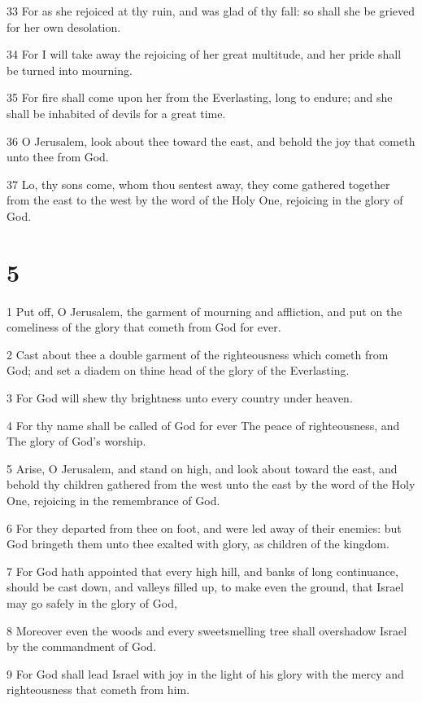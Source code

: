 \par 33 For as she rejoiced at thy ruin, and was glad of thy fall: so shall she be grieved for her own desolation.
\par 34 For I will take away the rejoicing of her great multitude, and her pride shall be turned into mourning.
\par 35 For fire shall come upon her from the Everlasting, long to endure; and she shall be inhabited of devils for a great time.
\par 36 O Jerusalem, look about thee toward the east, and behold the joy that cometh unto thee from God.
\par 37 Lo, thy sons come, whom thou sentest away, they come gathered together from the east to the west by the word of the Holy One, rejoicing in the glory of God.

\chapter{5}

\par 1 Put off, O Jerusalem, the garment of mourning and affliction, and put on the comeliness of the glory that cometh from God for ever.
\par 2 Cast about thee a double garment of the righteousness which cometh from God; and set a diadem on thine head of the glory of the Everlasting.
\par 3 For God will shew thy brightness unto every country under heaven.
\par 4 For thy name shall be called of God for ever The peace of righteousness, and The glory of God's worship.
\par 5 Arise, O Jerusalem, and stand on high, and look about toward the east, and behold thy children gathered from the west unto the east by the word of the Holy One, rejoicing in the remembrance of God.
\par 6 For they departed from thee on foot, and were led away of their enemies: but God bringeth them unto thee exalted with glory, as children of the kingdom.
\par 7 For God hath appointed that every high hill, and banks of long continuance, should be cast down, and valleys filled up, to make even the ground, that Israel may go safely in the glory of God,
\par 8 Moreover even the woods and every sweetsmelling tree shall overshadow Israel by the commandment of God.
\par 9 For God shall lead Israel with joy in the light of his glory with the mercy and righteousness that cometh from him.

